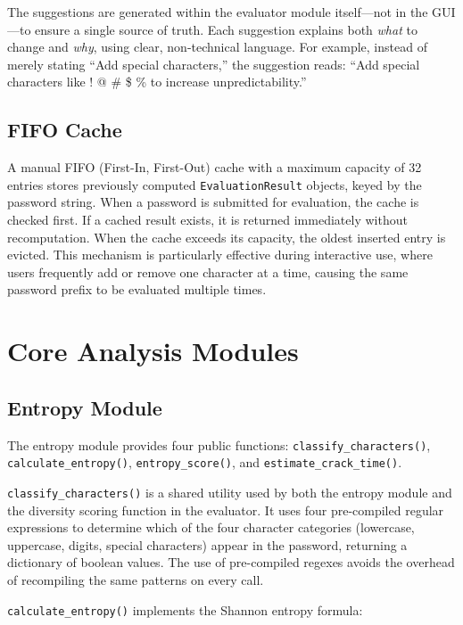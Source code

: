 The suggestions are generated within the evaluator module itself---not in the GUI---to ensure a single source of truth. Each suggestion explains both \textit{what} to change and \textit{why}, using clear, non-technical language. For example, instead of merely stating ``Add special characters,'' the suggestion reads: ``Add special characters like ! @ \# \$ \% to increase unpredictability.''

\subsection{FIFO Cache}

A manual FIFO (First-In, First-Out) cache with a maximum capacity of 32 entries stores previously computed \texttt{EvaluationResult} objects, keyed by the password string. When a password is submitted for evaluation, the cache is checked first. If a cached result exists, it is returned immediately without recomputation. When the cache exceeds its capacity, the oldest inserted entry is evicted. This mechanism is particularly effective during interactive use, where users frequently add or remove one character at a time, causing the same password prefix to be evaluated multiple times.

\clearpage

\section{Core Analysis Modules}

\subsection{Entropy Module}

The entropy module provides four public functions: \texttt{classify\_characters()}, \texttt{calculate\_entropy()}, \texttt{entropy\_score()}, and \texttt{estimate\_crack\_time()}.

\texttt{classify\_characters()} is a shared utility used by both the entropy module and the diversity scoring function in the evaluator. It uses four pre-compiled regular expressions to determine which of the four character categories (lowercase, uppercase, digits, special characters) appear in the password, returning a dictionary of boolean values. The use of pre-compiled regexes avoids the overhead of recompiling the same patterns on every call.

\texttt{calculate\_entropy()} implements the Shannon entropy formula:

